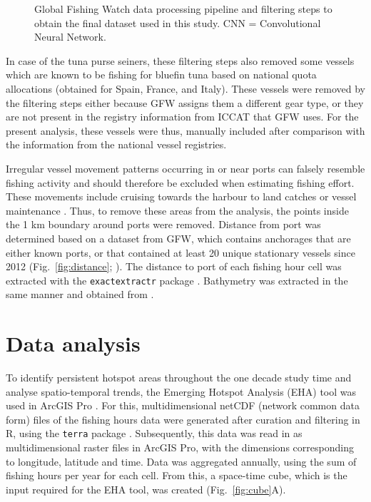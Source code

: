 \begin{figure}[htp]
\begin{center}
	\end{center}
	\caption{Global Fishing Watch data processing pipeline and filtering steps to obtain the final dataset used in this study. CNN = Convolutional Neural Network.}
	\label{fig:workflow}
\end{figure}

\medskip

In case of the tuna purse seiners, these filtering steps also removed some vessels which are known
to be fishing for bluefin tuna based on national quota allocations (obtained for Spain, France, and
Italy). These vessels were removed by the filtering steps either because GFW assigns them a
different gear type, or they are not present in the registry information from ICCAT that GFW uses.
For the present analysis, these vessels were thus, manually included after comparison with the
information from the national vessel registries.

\medskip

Irregular vessel movement patterns occurring in or near ports can falsely resemble fishing activity
and should therefore be excluded when estimating fishing effort. These movements include cruising
towards the harbour to land catches or vessel maintenance \citep{souza}. Thus, to remove these
areas from the analysis, the points inside the 1 km boundary around ports were removed. Distance
from port was determined based on a dataset from GFW, which contains anchorages that are either
known ports, or that contained at least 20 unique stationary vessels since 2012
(Fig.~\ref{fig:distance}; \citealp{gfw_distance}). The distance to port of each fishing hour cell
was extracted with the \texttt{exactextractr} package \citep{exactextractr}. Bathymetry was
extracted in the same manner and obtained from \cite{EMODnetDTM2024}.

\section{Data analysis}
To identify persistent hotspot areas throughout the one decade study time and analyse
spatio-temporal trends, the Emerging Hotspot Analysis (EHA) tool was used in ArcGIS Pro
\citep{arcgis}. For this, multidimensional netCDF (network common data form) files of the fishing
hours data were generated after curation and filtering in R, using the \texttt{terra} package
\citep{terra_package}. Subsequently, this data was read in as multidimensional raster files in
ArcGIS Pro, with the dimensions corresponding to longitude, latitude and time. Data was aggregated
annually, using the sum of fishing hours per year for each cell. From this, a space-time cube,
which is the input required for the EHA tool, was created (Fig.~\ref{fig:cube}A).

